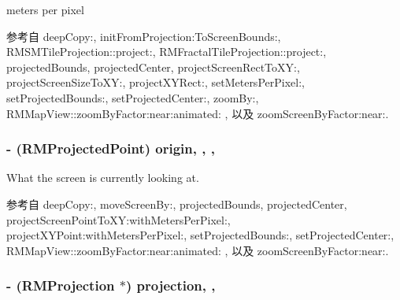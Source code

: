 meters per pixel 



参考自 deep\-Copy\-:, init\-From\-Projection\-:\-To\-Screen\-Bounds\-:, R\-M\-S\-M\-Tile\-Projection\-::project\-:, R\-M\-Fractal\-Tile\-Projection\-::project\-:, projected\-Bounds, projected\-Center, project\-Screen\-Rect\-To\-X\-Y\-:, project\-Screen\-Size\-To\-X\-Y\-:, project\-X\-Y\-Rect\-:, set\-Meters\-Per\-Pixel\-:, set\-Projected\-Bounds\-:, set\-Projected\-Center\-:, zoom\-By\-:, R\-M\-Map\-View\-::zoom\-By\-Factor\-:near\-:animated\-: , 以及 zoom\-Screen\-By\-Factor\-:near\-:.

\hypertarget{interface_r_m_mercator_to_screen_projection_abc3cfe961a255f28bb2ea051ae2cbaf5}{
\subsubsection[{origin}]{\setlength{\rightskip}{0pt plus 5cm}-\/ ({\bf R\-M\-Projected\-Point}) origin\hspace{0.3cm}{\ttfamily [read]}, {\ttfamily [write]}, {\ttfamily [atomic]}, {\ttfamily [assign]}}}\label{interface_r_m_mercator_to_screen_projection_abc3cfe961a255f28bb2ea051ae2cbaf5}


What the screen is currently looking at. 



参考自 deep\-Copy\-:, move\-Screen\-By\-:, projected\-Bounds, projected\-Center, project\-Screen\-Point\-To\-X\-Y\-:with\-Meters\-Per\-Pixel\-:, project\-X\-Y\-Point\-:with\-Meters\-Per\-Pixel\-:, set\-Projected\-Bounds\-:, set\-Projected\-Center\-:, R\-M\-Map\-View\-::zoom\-By\-Factor\-:near\-:animated\-: , 以及 zoom\-Screen\-By\-Factor\-:near\-:.

\hypertarget{interface_r_m_mercator_to_screen_projection_a410f2049effa29cfceb4fa87f77b3f22}{
\subsubsection[{projection}]{\setlength{\rightskip}{0pt plus 5cm}-\/ ({\bf R\-M\-Projection} $\ast$) projection\hspace{0.3cm}{\ttfamily [read]}, {\ttfamily [nonatomic]}, {\ttfamily [assign]}}}\label{interface_r_m_mercator_to_screen_projection_a410f2049effa29cfceb4fa87f77b3f22}


